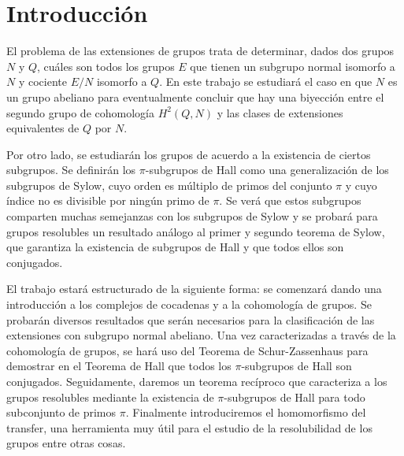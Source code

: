 
\chapter{Introducción}

El problema de las extensiones de grupos trata de determinar, dados dos grupos $N$ y $Q$, cuáles son todos los grupos $E$ que tienen un subgrupo normal isomorfo a $N$ y cociente $E/N$ isomorfo a $Q$. En este trabajo se estudiará el caso en que $N$ es un grupo abeliano para eventualmente concluir que hay una biyección entre el segundo grupo de cohomología $H^2(Q,N)$ y las clases de extensiones equivalentes de $Q$ por $N$.

Por otro lado, se estudiarán los grupos de acuerdo a la existencia de ciertos subgrupos. Se definirán los $\pi$-subgrupos de Hall como una generalización de los subgrupos de Sylow, cuyo orden es múltiplo de primos del conjunto $\pi$ y cuyo índice no es divisible por ningún primo de $\pi$. Se verá que estos subgrupos comparten muchas semejanzas con los subgrupos de Sylow y se probará para grupos resolubles un resultado análogo al primer y segundo teorema de Sylow, que garantiza la existencia de subgrupos de Hall y que todos ellos son conjugados.

El trabajo estará estructurado de la siguiente forma: se comenzará dando una introducción a los complejos de cocadenas y a la cohomología de grupos. Se probarán diversos resultados que serán necesarios para la clasificación de las extensiones con subgrupo normal abeliano. Una vez caracterizadas a través de la cohomología de grupos, se hará uso del Teorema de Schur-Zassenhaus para demostrar en el Teorema de Hall que todos los $\pi$-subgrupos de Hall son conjugados. Seguidamente, daremos un teorema recíproco que caracteriza a los grupos resolubles mediante la existencia de $\pi$-subgrupos de Hall para todo subconjunto de primos $\pi$. Finalmente introduciremos el homomorfismo del transfer, una herramienta muy útil para el estudio de la resolubilidad de los grupos entre otras cosas.
